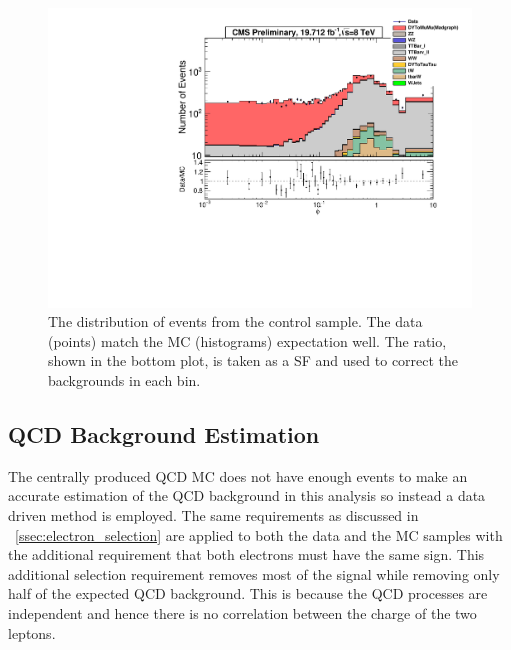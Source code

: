 \begin{figure}[!htbp]
    \centering
    \includegraphics[width=\textwidth]{figures/phistar_emu.pdf}
    \caption{
        The \phistar distribution of events from the \emu control sample. The
        data (points) match the MC (histograms) expectation well. The ratio,
        shown in the bottom plot, is taken as a SF and used to correct the
        backgrounds in each bin.
    }
    \label{fig:emu_background_check}
\end{figure}


\subsection{QCD Background Estimation}

The centrally produced QCD MC does not have enough events to make an accurate
estimation of the QCD background in this analysis so instead a data driven
method is employed. The same requirements as discussed in
\SEC~\ref{ssec:electron_selection} are applied to both the data and the MC
samples with the additional requirement that both electrons must have the same
sign. This additional selection requirement removes most of the signal while
removing only half of the expected QCD background. This is because the QCD
processes are independent and hence there is no correlation between the charge
of the two leptons.

